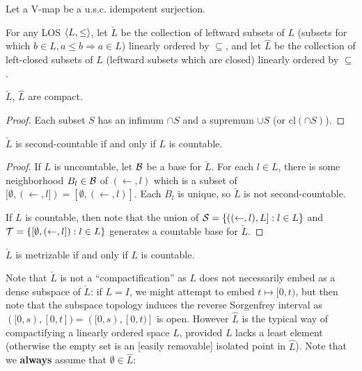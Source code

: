 \documentclass[11pt]{article}
\renewcommand{\cl}{\textrm{cl}}
\begin{document}
  \begin{definition}
    Let a V-map be a u.s.c. idempotent surjection.
  \end{definition}

  \begin{definition}
    For any LOS \(\langle L,\leq\rangle\), let \(\check L\) be the collection of
    leftward subsets of \(L\)
    (subsets for which \(b\in L,a\leq b\Rightarrow a\in L\))
    linearly ordered by \(\subseteq\), and let \(\hat L\) be the collection
    of left-closed subsets of \(L\) (leftward subsets which are closed)
    linearly ordered by \(\subseteq\).
  \end{definition}

  \begin{proposition}
    \(\check L\), \(\hat L\) are compact.
  \end{proposition}

  \begin{proof}
    Each subset \(S\) has an infimum \(\cap S\) and a supremum \(\cup S\)
    (or \(\cl(\cap S)\)).
  \end{proof}

  \begin{theorem}
    \(\check L\) is second-countable if and only if \(L\) is countable.
  \end{theorem}

  \begin{proof}
    If \(L\) is uncountable, let \(\mathcal{B}\) be a base for \(\check L\).
    For each \(l\in L\), there is some neighborhood \(B_l\in\mathcal{B}\) of
    \((\leftarrow,l)\) which is a subset of
    \([\emptyset,(\leftarrow,l])=[\emptyset,(\leftarrow,l)]\). Each \(B_l\)
    is unique, so \(\check L\) is not second-countable.

    If \(L\) is countable, then note that the union of
    \(\mathcal{S}=\{((\leftarrow,l),L]:l\in L\}\) and
    \(\mathcal{T}=\{[\emptyset,(\leftarrow,l]):l\in L\}\)
    generates a countable base for \(\check L\).
  \end{proof}

  \begin{corollary}
    \(\check L\) is metrizable if and only if \(L\) is countable.
  \end{corollary}

  Note that \(\check L\)
  is not a ``compactification'' as \(L\) does not necessarily
  embed as a dense subspace of \(\check L\): if \(L=I\), we might attempt to embed
  \(t\mapsto [0,t)\), but then note that the subspace topology induces the
  reverse Sorgenfrey interval as \(([0,s),[0,t])=([0,s),[0,t)]\) is open.
  However \(\hat L\) is
  the typical way of compactifying a linearly ordered space \(L\),
  provided \(L\) lacks a least element (otherwise the empty set is an [easily
  removable] isolated point in \(\hat L\)). Note that we \textbf{always}
  assume that \(\emptyset\in\hat L\):
\end{document}
